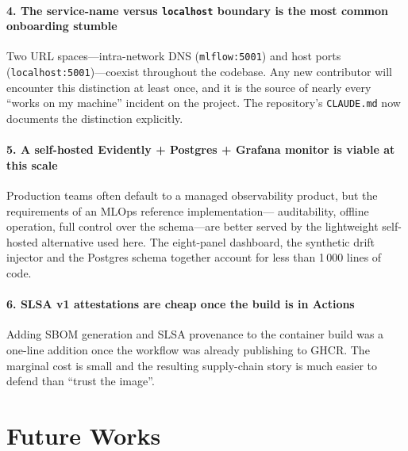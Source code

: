 \documentclass[conference,a4paper,10pt]{IEEEtran}
\begin{document}
\paragraph{4. The service-name versus \texttt{localhost} boundary is
the most common onboarding stumble}
Two URL spaces---intra-network DNS (\texttt{mlflow:5001}) and host
ports (\texttt{localhost:5001})---coexist throughout the codebase. Any
new contributor will encounter this distinction at least once, and it
is the source of nearly every ``works on my machine'' incident on the
project. The repository's \texttt{CLAUDE.md} now documents the
distinction explicitly.

\paragraph{5. A self-hosted Evidently + Postgres + Grafana monitor is
viable at this scale}
Production teams often default to a managed observability product,
but the requirements of an MLOps reference implementation---
auditability, offline operation, full control over the schema---are
better served by the lightweight self-hosted alternative used here.
The eight-panel dashboard, the synthetic drift injector and the
Postgres schema together account for less than 1\,000 lines of code.

\paragraph{6. SLSA v1 attestations are cheap once the build is in
Actions}
Adding SBOM generation and SLSA provenance to the container build was
a one-line addition once the workflow was already publishing to GHCR.
The marginal cost is small and the resulting supply-chain story is
much easier to defend than ``trust the image''.

\section{Future Works}\label{sec:future}
\end{document}
